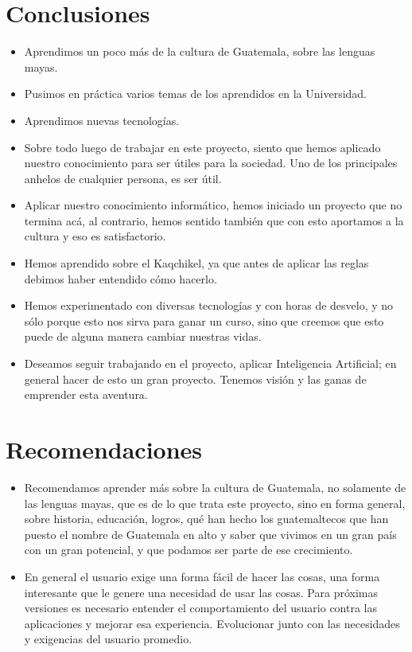 \documentclass[a4paper,openright,11pt]{article}
\begin{document}
\section{Conclusiones}
\begin{itemize}
	\item Aprendimos un poco más de la cultura de Guatemala, sobre las lenguas mayas.
	\item Pusimos en práctica varios temas de los aprendidos en la Universidad.
	\item Aprendimos nuevas tecnologías.
	\item Sobre todo luego de trabajar en este proyecto, siento que hemos aplicado nuestro conocimiento para ser útiles para la sociedad. Uno de los principales anhelos de cualquier persona, es ser útil.
	\item Aplicar nuestro conocimiento informático, hemos iniciado un proyecto que no termina acá, al contrario, hemos sentido también que con esto aportamos a la cultura y eso es satisfactorio.
	\item Hemos aprendido sobre el Kaqchikel, ya que antes de aplicar las reglas debimos haber entendido cómo hacerlo.
	\item Hemos experimentado con diversas tecnologías y con horas de desvelo, y no sólo porque esto nos sirva para ganar un curso, sino que creemos que esto puede de alguna manera cambiar nuestras vidas.
	\item Deseamos seguir trabajando en el proyecto, aplicar Inteligencia Artificial; en general hacer de esto un gran proyecto. Tenemos visión y las ganas de emprender esta aventura.
\end{itemize}
\newpage

\section{Recomendaciones}
\begin{itemize}
	\item Recomendamos aprender más sobre la cultura de Guatemala, no solamente de las lenguas mayas, que es de lo que trata este proyecto, sino en forma general, sobre historia, educación, logros, qué han hecho los guatemaltecos que han puesto el nombre de Guatemala en alto y saber que vivimos en un gran país con un gran potencial, y que podamos ser parte de ese crecimiento.
	\item En general el usuario exige una forma fácil de hacer las cosas, una forma interesante que le genere una necesidad de usar las cosas. Para próximas versiones es necesario entender el comportamiento del usuario contra las aplicaciones y mejorar esa experiencia. Evolucionar junto con las necesidades y exigencias del usuario promedio.
\end{itemize}
\newpage
\end{document}
